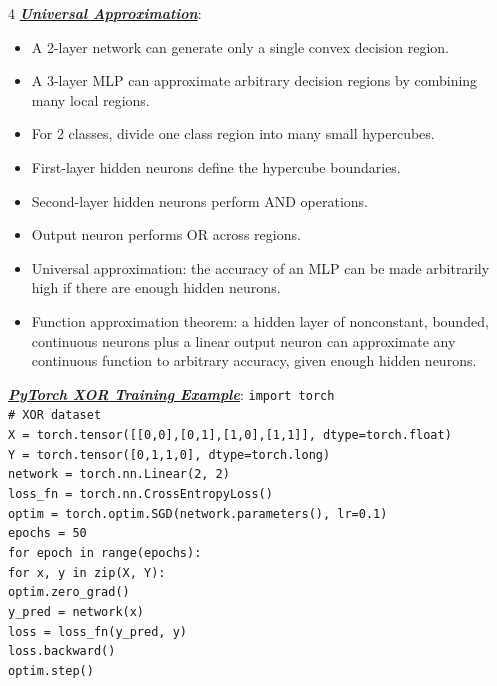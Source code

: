 \documentclass[12pt]{article}
\newcommand{\bulletPoint}[1]{\ul{\textit{\textbf{#1}}}}
\begin{document}
\begin{multicols*}{4}
\bulletPoint{Universal Approximation}:
\begin{itemize}
\item A 2-layer network can generate only a single convex decision region.
\item A 3-layer MLP can approximate arbitrary decision regions by combining many local regions.
\item For 2 classes, divide one class region into many small hypercubes.
\item First-layer hidden neurons define the hypercube boundaries.
\item Second-layer hidden neurons perform AND operations.
\item Output neuron performs OR across regions.
\item Universal approximation: the accuracy of an MLP can be made arbitrarily high if there are enough hidden neurons.
\item Function approximation theorem: a hidden layer of nonconstant, bounded, continuous neurons plus a linear output neuron can approximate any continuous function to arbitrary accuracy, given enough hidden neurons.
\end{itemize}

\bulletPoint{PyTorch XOR Training Example}:
\texttt{import torch}\\
\texttt{\# XOR dataset}\\
\texttt{X = torch.tensor([[0,0],[0,1],[1,0],[1,1]], dtype=torch.float)}\\
\texttt{Y = torch.tensor([0,1,1,0], dtype=torch.long)}\\
\texttt{network = torch.nn.Linear(2, 2)}\\
\texttt{loss\_fn = torch.nn.CrossEntropyLoss()}\\
\texttt{optim = torch.optim.SGD(network.parameters(), lr=0.1)}\\
\texttt{epochs = 50}\\
\texttt{for epoch in range(epochs):}\\
\hspace*{1em}\texttt{for x, y in zip(X, Y):}\\
\hspace*{2em}\texttt{optim.zero\_grad()}\\
\hspace*{2em}\texttt{y\_pred = network(x)}\\
\hspace*{2em}\texttt{loss = loss\_fn(y\_pred, y)}\\
\hspace*{2em}\texttt{loss.backward()}\\
\hspace*{2em}\texttt{optim.step()}


\end{multicols*}
\end{document}
